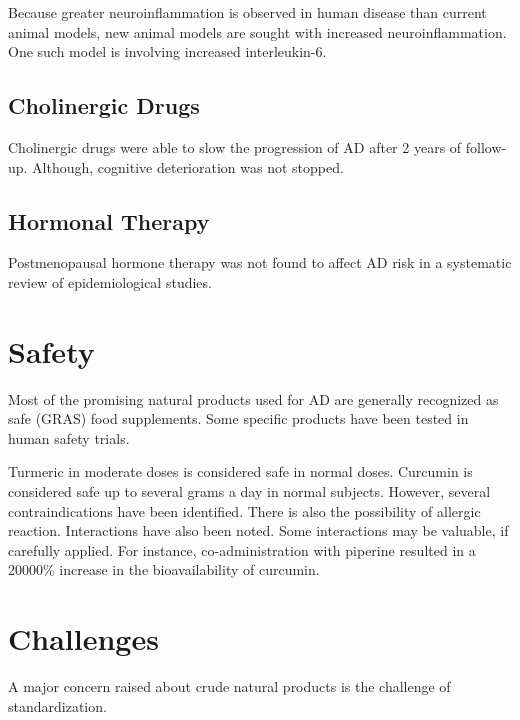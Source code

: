 \documentclass[twocolumn]{article}
\begin{document}
Because greater neuroinflammation is observed in human disease
than current animal models,
new animal models are sought with increased neuroinflammation.
One such model is involving increased interleukin-6.
\cite{millington2014chronic}




\subsection{Cholinergic Drugs}

Cholinergic drugs were able to slow the progression of AD
after 2 years of follow-up.
Although, cognitive deterioration was not stopped.
\cite{requena2006effects}




\subsection{Hormonal Therapy}
Postmenopausal hormone therapy was not found
to affect AD risk in a systematic review of
epidemiological studies.
\cite{o2014postmenopausal}

\section{Safety}

Most of the promising natural products used for AD
are generally recognized as safe (GRAS) food supplements.
Some specific products have been tested in human safety trials.



Turmeric in moderate doses is considered safe in normal doses.
Curcumin is considered safe up to several grams a day in normal subjects.
However, several contraindications have been identified.
There is also the possibility of allergic reaction.
Interactions have also been noted.
Some interactions may be valuable, if carefully applied.
For instance, co-administration with piperine resulted in a
20000\% increase in the bioavailability of curcumin.
\cite{mishra2008effect}








\section{Challenges}


A major concern raised about crude natural products is
the challenge of standardization.
\end{document}
